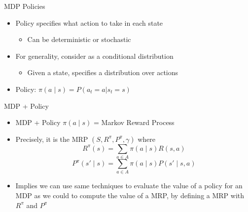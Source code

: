 \begin{frame}[c]{MDP Policies}

\begin{itemize}
	\item Policy specifies what action to take in each state
	\begin{itemize}
		\item Can be deterministic or stochastic
	\end{itemize}
	\item For generality, consider as a conditional distribution
	\begin{itemize}
		\item Given a state, specifies a distribution over actions
	\end{itemize}
	\item Policy: $\pi(a \mid s) = P(a_t=a | s_t = s)$
\end{itemize}


\end{frame}
\begin{frame}[c]{MDP + Policy}

\begin{itemize}
	\item MDP + Policy $\pi(a \mid s)$ = Markov Reward Process
	\item Precisely, it is the MRP $(S,R^\pi, P^\pi, \gamma)$ where
	$$R^\pi (s) = \sum_{a\in A} \pi(a\mid s ) R(s,a) $$
   $$P^\pi (s'\mid s) = \sum_{a\in A} \pi(a \mid s) P(s' \mid s,a)$$
   \item Implies we can use same techniques to evaluate the value of a policy  for an MDP as we could to compute the value of a MRP, by defining a
   MRP with $R^\pi$ and $P^\pi$
\end{itemize}

\end{frame}
